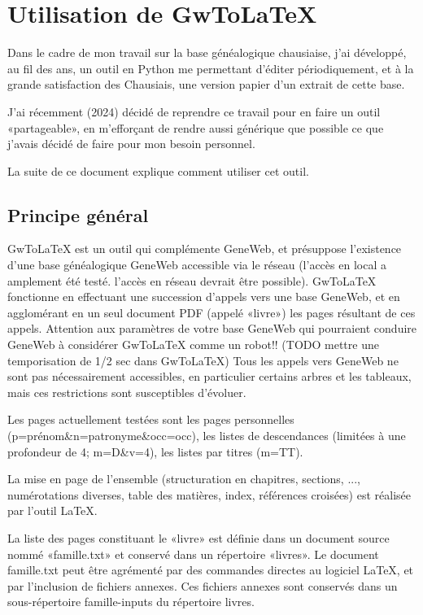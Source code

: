 
\section{Utilisation de GwToLaTeX}

Dans le cadre de mon travail sur la base généalogique chausiaise, j'ai développé,
au fil des ans, un outil en Python me permettant d'éditer périodiquement, et
à la grande satisfaction des Chausiais, une version papier d'un extrait de
cette base.

J'ai récemment (2024) décidé de reprendre ce travail pour en faire un outil
«partageable», en m'efforçant de rendre aussi générique que possible ce que j'avais
décidé de faire pour mon besoin personnel.

La suite de ce document explique comment utiliser cet outil.

\subsection{Principe général}

GwToLaTeX est un outil qui complémente GeneWeb, et présuppose l'existence d'une
base généalogique GeneWeb accessible via le réseau (l'accès en local a amplement
été testé. l'accès en réseau devrait être possible).
GwToLaTeX fonctionne en effectuant une succession d'appels vers une base GeneWeb,
et en agglomérant en un seul document PDF (appelé «livre») les pages résultant
de ces appels. Attention aux paramètres de votre base GeneWeb qui pourraient
conduire GeneWeb à considérer GwToLaTeX comme un robot!!
(TODO mettre une temporisation de 1/2 sec dans GwToLaTeX)
Tous les appels vers GeneWeb ne sont pas nécessairement accessibles, en
particulier certains arbres et les tableaux, mais ces restrictions sont
susceptibles d'évoluer.

Les pages actuellement testées sont les pages personnelles
(p=prénom\&n=patronyme\&occ=occ), les listes de descendances (limitées à
une profondeur de 4; m=D\&v=4), les listes par titres (m=TT).

La mise en page de l'ensemble (structuration en chapitres, sections, ...,
numérotations diverses, table des matières, index, références croisées)
est réalisée par l'outil LaTeX.

La liste des pages constituant le «livre» est définie dans un document source
nommé «famille.txt» et conservé dans un répertoire «livres».
Le document famille.txt peut être agrémenté par des commandes directes au
logiciel LaTeX, et par l'inclusion de fichiers annexes. Ces fichiers annexes
sont conservés dans un sous-répertoire famille-inputs du répertoire livres.

